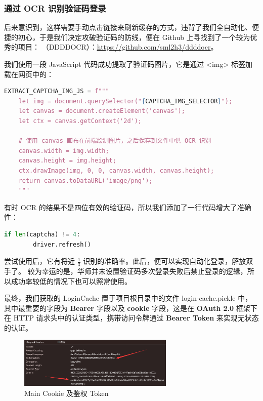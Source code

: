\documentclass[14pt,a4paper,UTF8,twoside]{article}
\renewcommand{\texttt}[1]{{\color{blue}\ttfamily#1}}
\begin{document}
\subsubsection{通过 OCR 识别验证码登录}

后来意识到，这样需要手动点击链接来刷新缓存的方式，违背了我们全自动化、便捷的初心，于是我们决定攻破验证码的防线，便在 Github 上寻找到了一个较为优秀的项目：
（DDDDOCR）：\href{https://github.com/sml2h3/ddddocr}{\underline{https://github.com/sml2h3/ddddocr}}。

我们使用一段 JavaScript 代码成功提取了验证码图片，它是通过 \texttt{<img>} 标签加载在网页中的：

\begin{lstlisting}[language=python]
    EXTRACT_CAPTCHA_IMG_JS = f"""
    let img = document.querySelector("{CAPTCHA_IMG_SELECTOR}");
    let canvas = document.createElement('canvas');
    let ctx = canvas.getContext('2d');

    # 使用 canvas 画布在前端绘制图片，之后保存到文件中供 OCR 识别
    canvas.width = img.width;
    canvas.height = img.height;
    ctx.drawImage(img, 0, 0, canvas.width, canvas.height);
    return canvas.toDataURL('image/png');
    """
\end{lstlisting}

有时 OCR 的结果不是四位有效的验证码，所以我们添加了一行代码增大了准确性：

\begin{lstlisting}[language=Python]
    if len(captcha) != 4:
        driver.refresh()
\end{lstlisting}

尝试使用后，它有将近 $\frac{1}{3}$ 识别的准确率。此后，便可以实现自动化登录，解放双手了。
较为幸运的是，华师并未设置验证码多次登录失败后禁止登录的逻辑，所以成功率较低的情况下也可以照常使用。

最终，我们获取的 \texttt{LoginCache} 置于项目根目录中的文件 \texttt{login-cache.pickle} 中，
其中最重要的字段为 \textbf{Bearer} 字段以及 \textbf{cookie} 字段，这是在 \textbf{OAuth 2.0} 框架下在 HTTP 请求头中的认证类型，携带访问令牌通过 \textbf{Bearer Token} 来实现无状态的认证。

\begin{figure}[H]
    \centering
    \includegraphics[width=0.66\textwidth]{img/main_cache.png}
    \caption{Main Cookie 及鉴权 Token}
    \label{fig:main_cache}
\end{figure}
\end{document}

